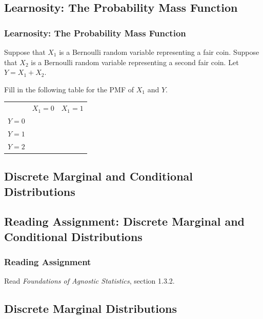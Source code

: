 \documentclass[12pt, block=fill]{beamer}
\begin{document}
\subsection{Learnosity: The Probability Mass Function}

\begin{frame}
  \frametitle{Learnosity: The Probability Mass Function}
  
  Suppose that $X_1$ is a Bernoulli random variable representing a
  fair coin.  Suppose that $X_2$ is a Bernoulli random variable
  representing a second fair coin.  Let $Y = X_1 + X_2$.
  
  Fill in the following table for the PMF of $X_1$ and $Y$.
  
  \begin{tabular}{c|c|c}
    & $X_1 = 0$ & $X_1 = 1$ \\
    $Y=0$ & &  \\  
    $Y=1$ &  & \\  
    $Y=2$ & & \\
  \end{tabular}
\end{frame}

\subsection{Discrete Marginal and Conditional Distributions} 

\subsection{Reading Assignment: Discrete Marginal and Conditional
  Distributions}

\begin{frame}
  \frametitle{Reading Assignment}
  Read \textit{Foundations of Agnostic Statistics}, section 1.3.2.
\end{frame}

\subsection{Discrete Marginal Distributions}
\end{document}
